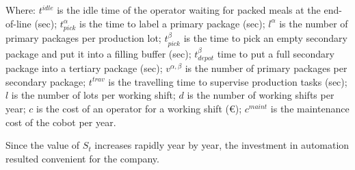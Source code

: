 Where: $t^{idle}$ is the idle time of the operator waiting for packed meals at the end-of-line (sec); $t_{pick}^\alpha$ is the time to label a primary package (sec); $l^\alpha$ is the number of primary packages per production lot; $t_{pick}^\beta$ is the time to pick an empty secondary package and put it into a filling buffer (sec); $t_{depot}^\beta$ time to put a full secondary package into a tertiary package (sec); $v^{\alpha,\beta}$ is the number of primary packages per secondary package; $t^{trav}$ is the travelling time to supervise production tasks (sec); $l$ is the number of lots per working shift; $d$ is the number of working shifts per year; $c$ is the cost of an operator for a working shift (\euro{}); $c^{maint}$ is the maintenance cost of the cobot per year. \par

Since the value of $S_t$ increases rapidly year by year, the investment in automation resulted convenient for the company.



	
